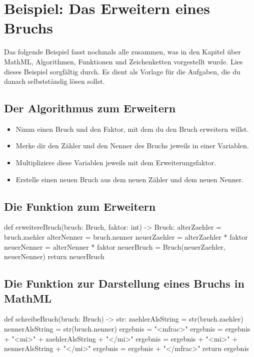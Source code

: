 \section{Beispiel: Das Erweitern eines Bruchs}

Das folgende Beispiel fasst nochmals alle zusammen, was in den Kapitel über MathML, Algorithmen, Funktionen und Zeichenketten vorgestellt wurde. Lies dieses Beispiel sorgfältig durch. Es dient als Vorlage für die Aufgaben, die du danach selbstständig lösen sollst.

\subsection{Der Algorithmus zum Erweitern}

\begin{itemize}
	\item Nimm einen Bruch und den Faktor, mit dem du den Bruch erweitern willst.
	\item Merke dir den Zähler und den Nenner des Bruchs jeweils in einer Variablen.
	\item Multipliziere diese Variablen jeweils mit dem Erweiterungsfaktor.
	\item Erstelle einen neuen Bruch aus dem neuen Zähler und dem neuen Nenner.
\end{itemize}

\subsection{Die Funktion zum Erweitern}
\label{sec:FunktionErweitern}

\begin{codePython}
def erweitereBruch(bruch: Bruch, faktor: int) -> Bruch:
	alterZaehler = bruch.zaehler
	alterNenner = bruch.nenner
	neuerZaehler = alterZaehler * faktor
	neuerNenner = alterNenner * faktor
	neuerBruch = Bruch(neuerZaehler, neuerNenner)
	return neuerBruch
\end{codePython}

\subsection{Die Funktion zur Darstellung eines Bruchs in MathML}
\label{sec:FunktionSchreibeBruch}

\begin{codePython}
def schreibeBruch(bruch: Bruch) -> str:
	zaehlerAlsString = str(bruch.zaehler)
	nennerAlsString = str(bruch.nenner)
	ergebnis = "<mfrac>"
	ergebnis = ergebnis + "<mi>" + zaehlerAlsString + "</mi>"
	ergebnis = ergebnis + "<mi>" + nennerAlsString + "</mi>"
	ergebnis = ergebnis + "</mfrac>"
	return ergebnis
\end{codePython}

